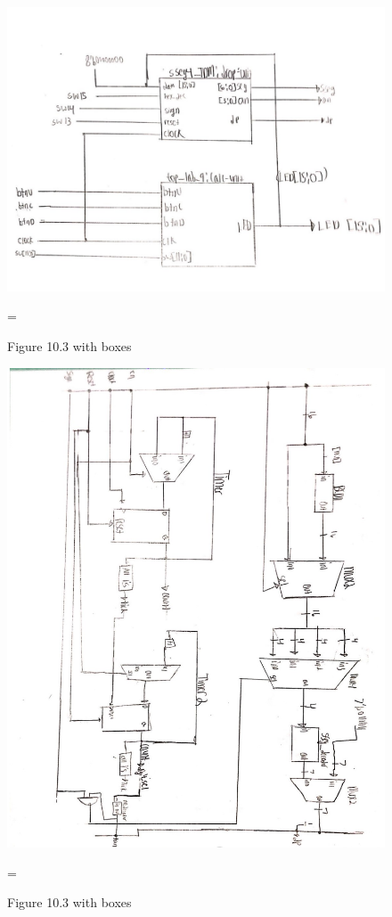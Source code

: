 \documentclass[11pt]{article}
\begin{document}
\begin{figure}[ht]\centering
	
	\includegraphics[width=1.0\textwidth]{Calculator}
	\caption{Figure 10.3 with boxes}
	\label{fig:sim_with_table}=
\end{figure}
\clearpage
\begin{figure}[ht]\centering
	
	\includegraphics[width=1.0\textwidth]{sseg4_tdm}
	\caption{Figure 10.3 with boxes}
	\label{fig:sim_with_table}=
\end{figure}
\clearpage
\end{document}
